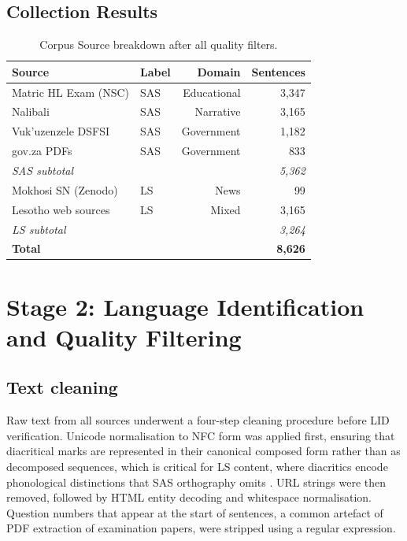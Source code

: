 \documentclass[11pt,a4paper]{article}
\begin{document}
\subsection{Collection Results}

\begin{table}[ht]
    \centering
    \label{tab:corpus_sources}
    \caption{Corpus Source breakdown after all quality filters.}
    \begin{tabular}{llrr}
     \toprule
    \textbf{Source} & \textbf{Label} & \textbf{Domain} & \textbf{Sentences} \\
    \midrule
    Matric HL Exam (NSC)   & SAS & Educational  & 3,347 \\
    Nalibali               & SAS & Narrative    & 3,165 \\
    Vuk'uzenzele DSFSI     & SAS & Government   & 1,182 \\
    gov.za PDFs            & SAS & Government   &   833 \\
    \midrule
    \textit{SAS subtotal}  &     &              & \textit{5,362} \\
    \midrule
    Mokhosi SN (Zenodo)    & LS  & News         &    99 \\
    Lesotho web sources    & LS  & Mixed        & 3,165 \\
    \midrule
    \textit{LS subtotal}   &     &              & \textit{3,264} \\
    \midrule
    \textbf{Total}         &     &              & \textbf{8,626} \\
    \bottomrule
    \end{tabular}
\end{table}



\section{Stage 2: Language Identification and Quality Filtering}

\subsection{Text cleaning}

Raw text from all sources underwent a four-step cleaning procedure before LID verification. Unicode normalisation to NFC form was applied first, ensuring that diacritical marks are represented in their canonical composed form rather than as decomposed sequences, which is critical for LS content, where diacritics encode phonological distinctions that SAS orthography omits \citep{matlosa2017sesotho}. URL strings were then removed, followed by HTML entity decoding and whitespace normalisation. Question numbers that appear at the start of sentences, a common artefact of PDF extraction of examination papers, were stripped using a regular expression.
\end{document}
